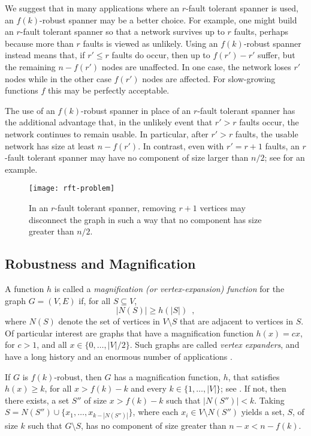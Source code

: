 \documentclass{patmorin}
\begin{document}
We suggest that in many applications where an $r$-fault tolerant
spanner is used, an $f(k)$-robust spanner may be a better choice.
For example, one might build an $r$-fault tolerant spanner so that a
network survives up to $r$ faults, perhaps because more than $r$ faults
is viewed as unlikely.  Using an $f(k)$-robust spanner instead means
that, if $r'\le r$ faults do occur, then up to $f(r')-r'$ suffer, but
the remaining $n-f(r')$ nodes are unaffected.  In one case, the network
loses $r'$ nodes while in the other case $f(r')$ nodes are affected.
For slow-growing functions $f$ this may be perfectly acceptable.

The use of an $f(k)$-robust spanner in place of an $r$-fault tolerant
spanner has the additional advantage that, in the unlikely event that $r'>
r$ faults occur, the network continues to remain usable.  In particular,
after $r'>r$ faults, the usable network has size at least $n-f(r')$. In
contrast, even with $r'=r+1$ faults, an $r$-fault tolerant spanner may
have no component of size larger than $n/2$; see 
for an example.

\begin{figure}
  \begin{center}
    \texttt{[image: rft-problem]}
  \end{center}
  \caption{In an $r$-fault tolerant spanner, removing $r+1$ vertices may
  disconnect the graph in such a way that no component has size greater
  than $n/2$.}
\end{figure}

\subsection{Robustness and Magnification}

A function $h$ is called a \emph{magnification
(or vertex-expansion) function} for the graph $G=(V,E)$ if, for all
$S\subseteq V$,
\[
    |N(S)| \ge h(|S|) \enspace ,
\]
where $N(S)$ denote the set of vertices in $V\setminus S$ that are
adjacent to vertices in $S$.  Of particular interest are graphs
that have a magnification function $h(x)=cx$, for $c>1$, and
all $x\in\{0,\ldots,|V|/2\}$.  Such graphs are called \emph{vertex
expanders}, and have a long history and an enormous number of applications
\cite{hlw06}.

If $G$ is $f(k)$-robust, then $G$ has a magnification function,
$h$, that satisfies $h(x) \ge k$, for all $x> f(k)-k$ and every
$k\in\{1,\ldots,|V|\}$; see .  If not, then
there exists, a set $S''$ of size $x>f(k)-k$ such that $|N(S'')|<
k$.  Taking $S=N(S'')\cup\{x_1,\ldots,x_{k-|N(S'')|}\}$, where each
$x_i\in V\setminus N(S'')$ yields a set, $S$, of size $k$ such that
$G\setminus S$, has no component of size greater than $n-x < n-f(k)$.
\end{document}
